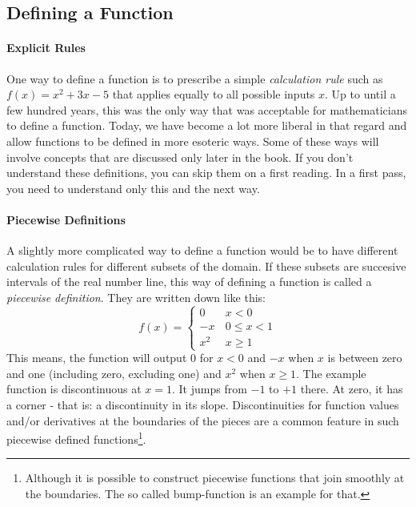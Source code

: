 
\subsection{Defining a Function}

\paragraph{Explicit Rules}
One way to define a function is to prescribe a simple \emph{calculation rule} such as $f(x) = x^2 + 3 x - 5$ that applies equally to all possible inputs $x$. Up to until a few hundred years, this was the only way that was acceptable for mathematicians to define a function. Today, we have become a lot more liberal in that regard and allow functions to be defined in more esoteric ways. Some of these ways will involve concepts that are discussed only later in the book. If you don't understand these definitions, you can skip them on a first reading. In a first pass, you need to understand only this and the next way.

\paragraph{Piecewise Definitions}
A slightly more complicated way to define a function would be to have different calculation rules for different subsets of the domain. If these subsets are succesive intervals of the real number line, this way of defining a function is called a \emph{piecewise definition}. They are written down like this:
\begin{equation}
f(x) = 
\begin{cases} 
 0 \quad& x < 0 \\
 -x     & 0   \leq x < 1 \\
 x^2    & x \geq 1
\end{cases}
\end{equation}
This means, the function will output $0$ for $x < 0$ and $-x$ when $x$ is between zero and one (including zero, excluding one) and $x^2$ when $x \geq 1$. The example function is discontinuous at $x=1$. It jumps from $-1$ to $+1$ there. At zero, it has a corner - that is: a discontinuity in its slope. Discontinuities for function values and/or derivatives at the boundaries of the pieces are a common feature in such piecewise defined functions\footnote{Although it is possible to construct piecewise functions that join smoothly at the boundaries. The so called bump-function is an example for that.}.


